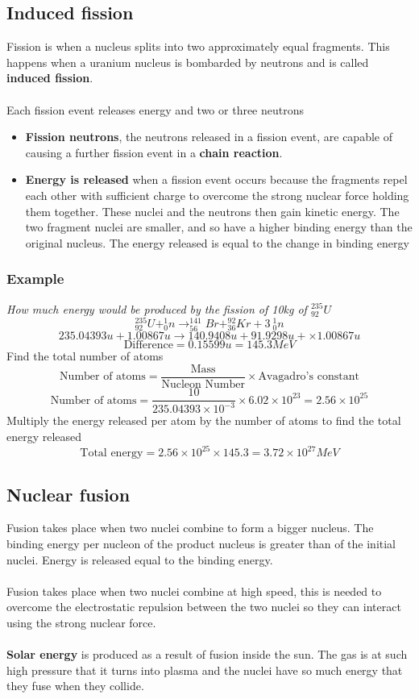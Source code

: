 \documentclass{article}[18pt]
\begin{document}
\subsection{Induced fission}
Fission is when a nucleus splits into two approximately equal fragments. This happens when a uranium nucleus is bombarded by neutrons and is called \textbf{induced fission}.\\
\\
Each fission event releases energy and two or three neutrons
\begin{itemize}
\item \textbf{Fission neutrons}, the neutrons released in a fission event, are capable of causing a further fission event in a \textbf{chain reaction}.
\item \textbf{Energy is released} when a fission event occurs because the fragments repel each other with sufficient charge to overcome the strong nuclear force holding them together. These nuclei and the neutrons then gain kinetic energy. The two fragment nuclei are smaller, and so have a higher binding energy than the original nucleus. The energy released is equal to the change in binding energy
\end{itemize}
\subsubsection{Example}
\textit{How much energy would be produced by the fission of 10kg of $^{235}_{92}U$}
$$^{235}_{92}U+^1_0n\rightarrow ^{141}_{56}Br+^{92}_{36}Kr+3 \ ^1_0n$$
$$235.04393u+1.00867u\rightarrow140.9408u+91.9298u+\times1.00867u$$
$$\textrm{Difference}=0.15599u=145.3MeV$$
Find the total number of atoms
$$\textrm{Number of atoms}=\frac{\textrm{Mass}}{\textrm{Nucleon Number}}\times \textrm{Avagadro's constant}$$
$$\textrm{Number of atoms}=\frac{10}{235.04393\times10^{-3}}\times6.02\times10^{23}=2.56\times10^{25}$$
Multiply the energy released per atom by the number of atoms to find the total energy released
$$\textrm{Total energy}=2.56\times10^{25}\times145.3=3.72\times10^{27}MeV$$
\subsection{Nuclear fusion}
Fusion takes place when two nuclei combine to form a bigger nucleus. The binding energy per nucleon of the product nucleus is greater than of the initial nuclei. Energy is released equal to the binding energy.\\
\\
Fusion takes place when two nuclei combine at high speed, this is needed to overcome the electrostatic repulsion between the two nuclei so they can interact using the strong nuclear force.\\
\\
\textbf{Solar energy} is produced as a result of fusion inside the sun. The gas is at such high pressure that it turns into plasma and the nuclei have so much energy that they fuse when they collide.
\end{document}
